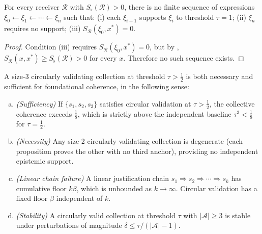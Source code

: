 \begin{theorem}
\label{thm:linear-failure}
For every receiver $\mathcal{R}$ with $S_\flat(\mathcal{R}) > 0$, there is
no finite sequence of expressions $\xi_0 \leftarrow \xi_1 \leftarrow \cdots
\leftarrow \xi_n$ such that: (i) each $\xi_{i+1}$ supports $\xi_i$ to
threshold $\tau = 1$; (ii) $\xi_n$ requires no support; (iii)
$S_{\mathcal{R}}(\xi_0, x^*) = 0$.
\end{theorem}

\begin{proof}
Condition (iii) requires $S_{\mathcal{R}}(\xi_0, x^*) = 0$, but by
, $S_{\mathcal{R}}(x, x^*) \geq S_\flat(\mathcal{R}) > 0$
for every $x$.  Therefore no such sequence exists.
\end{proof}

\begin{theorem}
\label{thm:circular-validation}
A size-3 circularly validating collection at threshold $\tau > \tfrac{1}{2}$
is both necessary and sufficient for foundational coherence, in the following
sense:
\begin{enumerate}[(a)]
  \item \emph{(Sufficiency)} If $\{s_1, s_2, s_3\}$ satisfies circular
    validation at $\tau > \tfrac{1}{2}$, the collective coherence exceeds
    $\tfrac{1}{8}$, which is strictly above the independent baseline
    $\tau^3 < \tfrac{1}{8}$ for $\tau = \tfrac{1}{2}$.
  \item \emph{(Necessity)} Any size-2 circularly validating collection is
    degenerate (each proposition proves the other with no third anchor),
    providing no independent epistemic support.
  \item \emph{(Linear chain failure)} A linear justification chain
    $s_1 \Rightarrow s_2 \Rightarrow \cdots \Rightarrow s_k$ has cumulative
    floor $k\beta$, which is unbounded as $k \to \infty$.  Circular
    validation has a fixed floor $\beta$ independent of $k$.
  \item \emph{(Stability)} A circularly valid collection at threshold
    $\tau$ with $|\mathcal{A}| \geq 3$ is stable under perturbations of
    magnitude $\delta \leq \tau / (|\mathcal{A}| - 1)$.
\end{enumerate}
\end{theorem}

